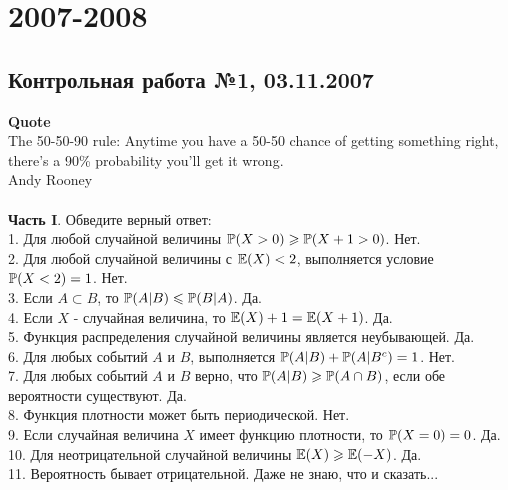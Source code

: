 \documentclass[12pt, a4paper]{article}\usepackage[]{graphicx}\usepackage[]{color}
\begin{document}
\section{2007-2008}



\subsection{Контрольная работа №1, 03.11.2007}

\textbf{Quote}\\
The 50-50-90 rule: Anytime you have a 50-50 chance of getting something right, there's a 90\% probability you'll get it wrong. \\
Andy Rooney\\ \\

\textbf{Часть I}. Обведите верный ответ: \\

1. Для любой случайной величины $\P(X>0)\ge \P(X+1>0)$. Нет. \\

2. Для любой случайной величины с $\E(X)<2$, выполняется условие $\P(X<2)=1$. Нет. \\

3. Если $A\subset B$, то $\P(A|B)\le \P(B|A)$. Да. \\

4. Если  $X$  - случайная величина, то $\E(X)+1=\E(X+1)$. Да. \\

5. Функция распределения случайной величины является неубывающей. Да. \\

6. Для любых событий $A$ и $B$, выполняется $\P(A|B)+\P(A|B^{c})=1$. Нет. \\

7. Для любых событий  $A$  и  $B$  верно, что $\P(A|B)\ge \P(A\cap
B)$, если обе вероятности существуют. Да.  \\

8. Функция плотности может быть периодической. Нет. \\

9. Если случайная величина $X$ имеет функцию плотности, то $\P(X=0)=0$. Да.  \\

10. Для неотрицательной случайной величины $\E(X)\ge \E(-X)$. Да. \\

11. Вероятность бывает отрицательной. Даже не знаю, что и сказать... \\
\end{document}
